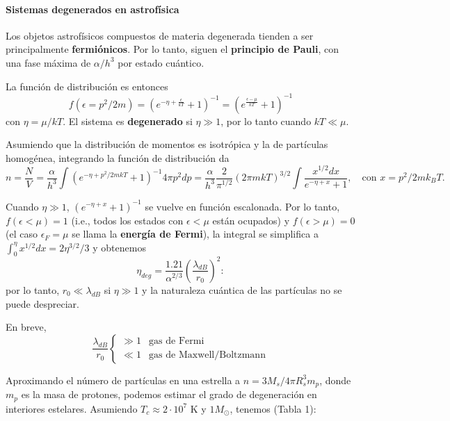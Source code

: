\documentclass[11pt,letterpaper]{article}
\begin{document}
\paragraph{Sistemas degenerados en astrofísica}
Los objetos astrofísicos compuestos de materia degenerada tienden a ser principalmente \textbf{fermiónicos}. Por lo tanto, siguen el \textbf{principio de Pauli}, con una fase máxima de \(\alpha/h^3\) por estado cuántico.

La función de distribución es entonces 
\begin{equation}
    f(\epsilon = p^2/2m) = \left( e^{-\eta + \frac{\epsilon}{kT}} + 1 \right)^{-1} = \left( e^{\frac{\epsilon - \mu}{kT}} + 1 \right)^{-1}
\end{equation}
con \(\eta = \mu/kT\). El sistema es \textbf{degenerado} si \(\eta \gg 1\), por lo tanto cuando \(kT \ll \mu\).

Asumiendo que la distribución de momentos es isotrópica y la de partículas homogénea, integrando la función de distribución da
\begin{equation}
    n = \frac{N}{V} = \frac{\alpha}{h^3} \int \left( e^{-\eta + p^2/2mkT} + 1 \right)^{-1} 4 \pi p^2 dp = \frac{\alpha}{h^3} \frac{2}{\pi^{1/2}} (2\pi mkT)^{3/2} \int \frac{x^{1/2} dx}{e^{-\eta + x} + 1}, \quad \text{con } x = p^2/2mk_BT.
\end{equation}

Cuando \(\eta \gg 1\), \((e^{-\eta + x} + 1)^{-1}\) se vuelve en función escalonada. Por lo tanto, \(f(\epsilon < \mu) = 1\) (i.e., todos los estados con \(\epsilon < \mu\) están ocupados) y \(f(\epsilon > \mu) = 0\) (el caso \(\epsilon_F = \mu\) se llama la \textbf{energía de Fermi}), la integral se simplifica a \(\int_0^\eta x^{1/2} dx = 2 \eta^{3/2}/3\) y obtenemos
\begin{equation}
    \eta_{deg} = \frac{1.21}{\alpha^{2/3}} \left( \frac{\lambda_{dB}}{r_0} \right)^2 :
\end{equation}
por lo tanto, \(r_0 \ll \lambda_{dB}\) si \(\eta \gg 1\) y la naturaleza cuántica de las partículas no se puede despreciar.

En breve,
\begin{equation}
    \frac{\lambda_{dB}}{r_0} \begin{cases} \gg 1 & \text{gas de Fermi} \\ \ll 1 & \text{gas de Maxwell/Boltzmann} \end{cases}
\end{equation}

Aproximando el número de partículas en una estrella a \(n = 3M_s/4\pi R_s^3 m_p\), donde \(m_p\) es la masa de protones, podemos estimar el grado de degeneración en interiores estelares. Asumiendo \(T_c \approx 2 \cdot 10^7\) K y \(1 M_\odot\), tenemos (Tabla 1):
\end{document}
